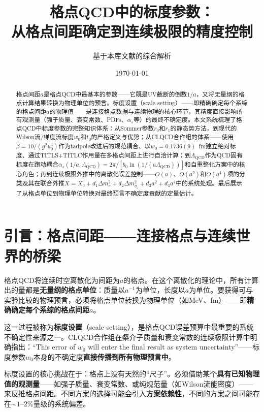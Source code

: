 \documentclass[12pt,a4paper]{ctexart}
\title{\heiti 格点QCD中的标度参数：\\
从格点间距确定到连续极限的精度控制}
\author{基于本库文献的综合解析}
\date{\today}
\theoremstyle{definition}
\begin{document}
\maketitle

\begin{abstract}
\noindent
格点间距$a$是格点QCD中最基本的参数——它既是UV截断的倒数$1/a$，又将无量纲的格点计算结果转换为物理单位的预言。标度设置（scale setting）——即精确确定每个系综的格点间距$a$的物理值——是连接格点数据与连续物理的核心环节，其精度直接影响所有观测量（强子质量、衰变常数、PDFs、$\alpha_s$等）的最终不确定度。本文系统梳理了格点QCD中标度参数的完整知识体系：从Sommer参数$r_0$和$r_1$的静态势方法，到现代的Wilson流/梯度流标度$w_0$和$t_0$的严格定义与优势；从CLQCD合作组的体系——使用$\hat{\beta} = 10/(g^2 u^4_0)$作为tadpole改进后的规范耦合、以$w_0 = 0.1736(9)$~fm建立绝对标度、通过TITLS+TITLC作用量在多格点间距上进行自洽计算；到$\Lambda_{\text{QCD}}$作为QCD固有标度在跑动耦合$\alpha_s(1/a, \Lambda_{\text{QCD}}) = 2\pi/[b_0\ln(1/(a\Lambda_{\text{QCD}}))]$和自重整化方案中的核心角色；再到连续极限外推中的离散化误差控制——$O(a)$、$O(a^2)$和$O(a^4)$项的分类及其在联合外推$X = X_0 + d_1\Delta m^2_\pi + d_2\Delta m^2_{\eta_s} + d_3 a^2 + d_4 a^4$中的系统处理。最后展示了从格点单位到物理单位转换对最终预言不确定度贡献的定量估计。
\end{abstract}

\tableofcontents
\newpage

\section{引言：格点间距——连接格点与连续世界的桥梁}

格点QCD将连续时空离散化为间距为$a$的格点。在这个离散化的理论中，所有计算出的量都是\textbf{无量纲的格点单位}：质量以$a^{-1}$为单位，长度以$a$为单位。要获得可与实验比较的物理预言，必须将格点单位转换为物理单位（如MeV、fm）——即\textbf{精确确定每个系综的格点间距$a$}。

这一过程被称为\textbf{标度设置}（scale setting），是格点QCD误差预算中最重要的系统不确定性来源之一。CLQCD合作组在粲介子质量和衰变常数的连续极限计算中\cite{CLQCD2024charm}明确指出：``This error of $w_0$ will enter the final result as system uncertainty''——标度参数$w_0$本身的不确定度\textbf{直接传播到所有物理预言中}。

标度设置的核心挑战在于：格点上没有天然的``尺子''。必须借助某个\textbf{具有已知物理值的观测量}——如强子质量、衰变常数、或纯规范量（如Wilson流能密度）——来反推格点间距。不同方案的选择可能会引入\textbf{方案依赖性}，不同的方案之间可能存在$\sim 1$--$2\%$量级的系统偏差。
\end{document}
